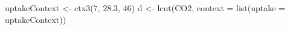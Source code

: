 \begin{Schunk}
% --begin: "pbld2"
\begin{Sinput}
uptakeContext <- ctx3(7, 28.3, 46)
d <- lcut(CO2, context = list(uptake = uptakeContext))
\end{Sinput}
%
% --end: "pbld2"
\end{Schunk}

